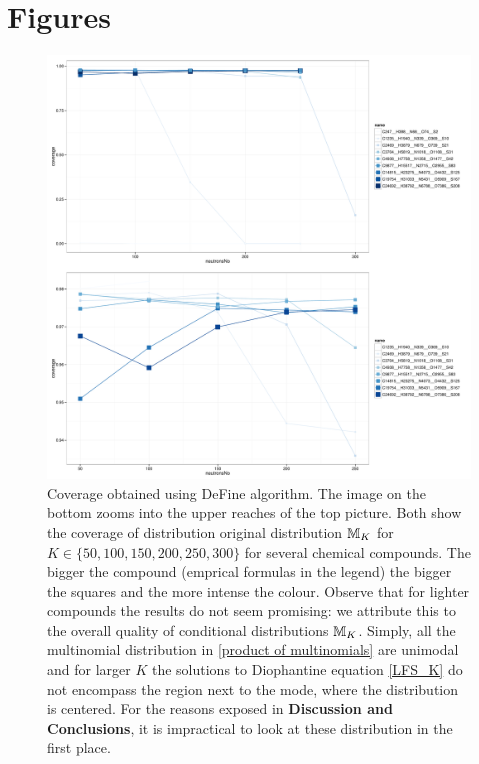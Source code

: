 \section*{Figures}


\begin{figure}[htbp]
 \centering
 \includegraphics[width=.8\textwidth]{./img/DeFineCoverage}
 \caption{Coverage obtained using {\sc DeFine} algorithm. The image on the bottom zooms into the upper reaches of the top picture. Both show the coverage of distribution original distribution $\mathbb{M}_K$ for $K \in \{50, 100, 150, 200, 250, 300 \}$ for several chemical compounds. The bigger the compound (emprical formulas in the legend) the bigger the squares and the more intense the colour. Observe that for lighter compounds the results do not seem promising: we attribute this to the overall quality of conditional distributions $\mathbb{M}_K$. Simply, all the multinomial distribution in \eqref{product of multinomials} are unimodal and for larger $K$ the solutions to Diophantine equation \eqref{LFS_K} do not encompass the region next to the mode, where the distribution is centered. For the reasons exposed in \textbf{Discussion and Conclusions}, it is impractical to look at these distribution in the first place.}
 \label{figure: Coverage}
\end{figure}

